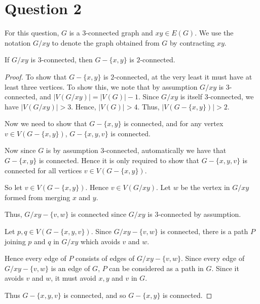 \documentclass{unswmaths}
\begin{document}
\section*{Question 2}
For this question, $G$ is a $3$-connected graph and $xy \in E(G)$. 
We use the notation $G/xy$ to denote the graph obtained from $G$
by contracting $xy$.

\begin{proposition}[Part (a)]
    If $G/xy$ is $3$-connected, then $G - \{x,y\}$ is $2$-connected.
\end{proposition}
\begin{proof}
    To show that $G-\{x,y\}$ is $2$-connected, at the very least it must have at
    least three vertices. To show this, we note that by assumption $G/xy$ is $3$-connected,
    and $|V(G/xy)| = |V(G)|-1$. Since $G/xy$ is itself $3$-connected, we have $|V(G/xy)| > 3$.
    Hence, $|V(G)| > 4$. Thus, $|V(G-\{x,y\})| > 2$. 
    
    Now we need to show that $G-\{x,y\}$ is connected, and for any vertex $v \in V(G-\{x,y\})$,
    $G-\{x,y,v\}$ is connected. 
    
    Now since $G$ is by assumption $3$-connected, automatically we have that $G-\{x,y\}$ is connected.
    Hence it is only required to show that $G-\{x,y,v\}$ is connected for all
    vertices $v \in V(G-\{x,y\})$. 
    
    So let $v \in V(G-\{x,y\})$. Hence $v \in V(G/xy)$.
    Let $w$ be the vertex in $G/xy$ formed from merging $x$ and $y$.
    
    Thus, $G/xy-\{v,w\}$ is connected since $G/xy$ is $3$-connected by assumption.
    
    Let $p,q \in V(G-\{x,y,v\})$. Since $G/xy-\{v,w\}$ is connected,
    there is a path $P$ joining $p$ and $q$ in $G/xy$ which avoids $v$ and $w$. 
    
    Hence every edge of $P$ consists of edges of $G/xy-\{v,w\}$. 
    Since every edge of $G/xy-\{v,w\}$ is an edge of $G$, $P$
    can be considered as a path in $G$. Since it avoids $v$ and $w$, it 
    must avoid $x,y$ and $v$ in $G$.     
    
    Thus $G-\{x,y,v\}$ is
    connected, and so $G-\{x,y\}$ is connected. 
\end{proof}
\end{document}

